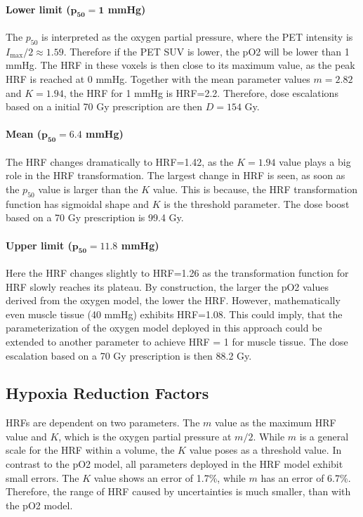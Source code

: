 \paragraph{Lower limit ($\mathbf{p_{50}=1}$ mmHg)}The $p_{50}$ is interpreted as the oxygen partial pressure, where the PET intensity is $I_\mathrm{max}/2\approx 1.59$. Therefore if the PET SUV is lower, the pO2 will be lower than 1 mmHg. The HRF in these voxels is then close to its maximum value, as the peak HRF is reached at 0 mmHg. Together with the mean parameter values $m=2.82$ and $K=1.94$, the HRF for 1 mmHg is HRF=2.2. Therefore, dose escalations based on a initial 70 Gy prescription are then $D=154$ Gy.
\paragraph{Mean ($\mathbf{p_{50}=6.4}$ mmHg)}The HRF changes dramatically to HRF=1.42, as the $K=1.94$ value plays a big role in the HRF transformation. The largest change in HRF is seen, as soon as the $p_{50}$ value is larger than the $K$ value. This is because, the HRF transformation function has sigmoidal shape and $K$ is the threshold parameter. The dose boost based on a 70 Gy prescription is 99.4 Gy.
\paragraph{Upper limit ($\mathbf{p_{50}=11.8}$ mmHg)}Here the HRF changes slightly to HRF=1.26 as the transformation function for HRF slowly reaches its plateau. By construction, the larger the pO2 values derived from the oxygen model, the lower the HRF. However, mathematically even muscle tissue (40 mmHg) exhibits HRF=1.08. This could imply, that the parameterization of the oxygen model deployed in this approach could be extended to another parameter to achieve HRF = 1 for muscle tissue. The dose escalation based on a 70 Gy prescription is then 88.2 Gy.
\subsection{Hypoxia Reduction Factors}
HRFs are dependent on two parameters. The $m$ value as the maximum HRF value and $K$, which is the oxygen partial pressure at $m/2$. While $m$ is a general scale for the HRF within a volume, the $K$ value poses as a threshold value. In contrast to the pO2 model, all parameters deployed in the HRF model exhibit small errors. The $K$ value shows an error of 1.7\%, while $m$ has an error of 6.7\%. Therefore, the range of HRF caused by uncertainties is much smaller, than with the pO2 model.

